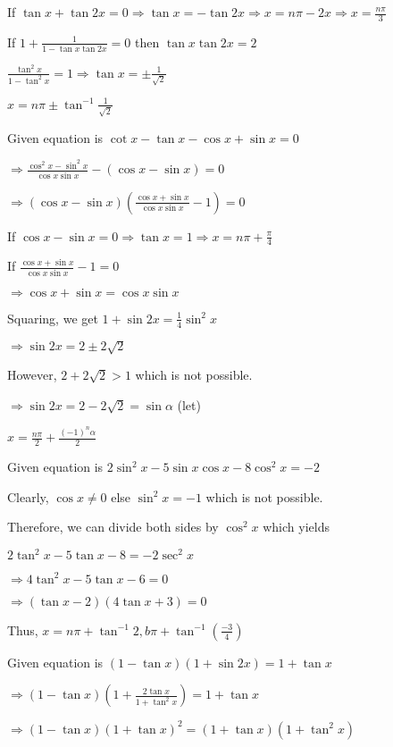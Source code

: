   If $\tan x + \tan 2x = 0 \Rightarrow \tan x = -\tan 2x \Rightarrow x = n\pi -2x \Rightarrow x = \frac{n\pi}{3}$

  If $1 + \frac{1}{1 - \tan x\tan 2x} = 0$ then $\tan x\tan 2x = 2$

  $\frac{\tan^2x}{1 -\tan^2x} = 1 \Rightarrow \tan x = \pm\frac{1}{\sqrt{2}}$

  $x = n\pi \pm\tan^{-1}\frac{1}{\sqrt{2}}$
\item Given equation is $\cot x - \tan x - \cos x + \sin x = 0$

  $\Rightarrow \frac{\cos^2x - \sin^2x}{\cos x\sin x} - (\cos x - \sin x) = 0$

  $\Rightarrow (\cos x - \sin x)\left(\frac{\cos x + \sin x}{\cos x\sin x} - 1\right) = 0$

  If $\cos x - \sin x = 0 \Rightarrow \tan x = 1\Rightarrow x = n\pi + \frac{\pi}{4}$

  If $\frac{\cos x + \sin x}{\cos x\sin x} - 1= 0$

  $\Rightarrow \cos x + \sin x = \cos x\sin x$

  Squaring, we get $1 + \sin2x = \frac{1}{4}\sin^2x$

  $\Rightarrow \sin2x = 2\pm 2\sqrt{2}$

  However, $2 + 2\sqrt{2} > 1$ which is not possible.

  $\Rightarrow \sin 2x = 2 - 2\sqrt{2} = \sin\alpha$ (let)

  $x = \frac{n\pi}{2} + \frac{(-1)^n\alpha}{2}$
\item Given equation is $2\sin^2x - 5\sin x\cos x - 8\cos^2x = -2$

  Clearly, $\cos x \neq 0$ else $\sin^2x = -1$ which is not possible.

  Therefore, we can divide both sides by $\cos^2x$ which yields

  $2\tan^2x - 5\tan x -8 = -2\sec^2x$

  $\Rightarrow 4\tan^2x - 5\tan x - 6 = 0$

  $\Rightarrow (\tan x - 2)(4\tan x + 3) = 0$

  Thus, $x = n\pi + \tan^{-1}2, b\pi + \tan^{-1}\left(\frac{-3}{4}\right)$

\item Given equation is $(1 - \tan x)(1 + \sin2x) = 1 + \tan x$

  $\Rightarrow (1 - \tan x)\left(1 + \frac{2\tan x}{1 + \tan^2x}\right) = 1 + \tan x$

  $\Rightarrow (1 - \tan x)(1 + \tan x)^2 = (1 + \tan x)(1 + \tan^2x)$

